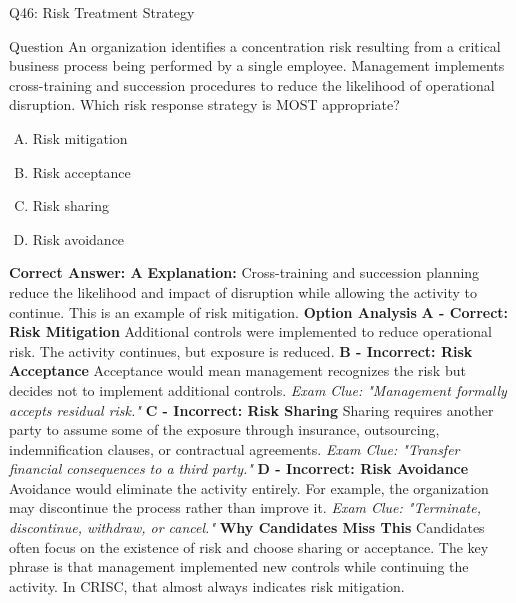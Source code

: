 \documentclass{beamer}
\begin{document}
	

	\begin{frame}{Q46: Risk Treatment Strategy} \begin{block}{Question} An organization identifies a concentration risk resulting from a critical business process being performed by a single employee. Management implements cross-training and succession procedures to reduce the likelihood of operational disruption. Which risk response strategy is MOST appropriate? \begin{enumerate}[(A)] \item Risk mitigation \item Risk acceptance \item Risk sharing \item Risk avoidance \end{enumerate} \textbf{Correct Answer: A} \vspace{0.2cm} \textbf{Explanation:} Cross-training and succession planning reduce the likelihood and impact of disruption while allowing the activity to continue. This is an example of risk mitigation. \vspace{0.2cm} \textbf{Option Analysis} \textbf{A - Correct: Risk Mitigation} Additional controls were implemented to reduce operational risk. The activity continues, but exposure is reduced. \vspace{0.2cm} \textbf{B - Incorrect: Risk Acceptance} Acceptance would mean management recognizes the risk but decides not to implement additional controls. \textit{Exam Clue: "Management formally accepts residual risk."} \vspace{0.2cm} \textbf{C - Incorrect: Risk Sharing} Sharing requires another party to assume some of the exposure through insurance, outsourcing, indemnification clauses, or contractual agreements. \textit{Exam Clue: "Transfer financial consequences to a third party."} \vspace{0.2cm} \textbf{D - Incorrect: Risk Avoidance} Avoidance would eliminate the activity entirely. For example, the organization may discontinue the process rather than improve it. \textit{Exam Clue: "Terminate, discontinue, withdraw, or cancel."} \vspace{0.2cm} \textbf{Why Candidates Miss This} Candidates often focus on the existence of risk and choose sharing or acceptance. The key phrase is that management implemented new controls while continuing the activity. In CRISC, that almost always indicates risk mitigation. \end{block} \end{frame}
	
\end{document}
